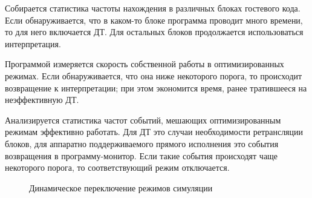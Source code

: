 \begin{itemize*}
\item Собирается статистика частоты нахождения в различных блоках гостевого кода. Если обнаруживается, что в каком-то блоке программа проводит много времени, то для него включается ДТ. Для остальных блоков продолжается использоваться интерпретация.

\item Программой измеряется скорость собственной работы в оптимизированных режимах. Если обнаруживается, что она ниже некоторого порога, то происходит  возвращение к интерпретации; при этом экономится время, ранее тратившееся на неэффективную ДТ.

\item Анализируется статистика частот событий, мешающих оптимизированным режимам эффективно работать. Для ДТ это случаи необходимости ретрансляции блоков, для аппаратно поддерживаемого прямого исполнения это события возвращения в программу-монитор. Если такие события происходят чаще некоторого порога, то соответствующий режим отключается.
\end{itemize*}


\begin{figure}[htb]
    \centering
    \caption[Динамическое переключение режимов симуляции]{Динамическое переключение режимов симуляции}
    \label{fig:gearbox}
\end{figure}


